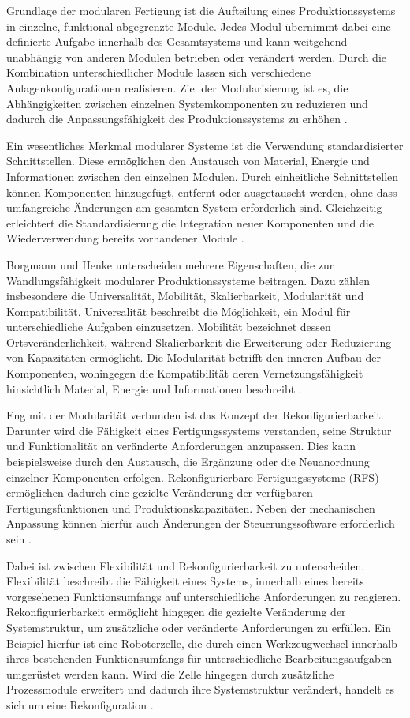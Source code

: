 Grundlage der modularen Fertigung ist die Aufteilung eines Produktionssystems in einzelne, funktional abgegrenzte Module. Jedes Modul übernimmt dabei eine definierte Aufgabe innerhalb des Gesamtsystems und kann weitgehend unabhängig von anderen Modulen betrieben oder verändert werden. Durch die Kombination unterschiedlicher Module lassen sich verschiedene Anlagenkonfigurationen realisieren. Ziel der Modularisierung ist es, die Abhängigkeiten zwischen einzelnen Systemkomponenten zu reduzieren und dadurch die Anpassungsfähigkeit des Produktionssystems zu erhöhen \cite{Borgmann2026}.

Ein wesentliches Merkmal modularer Systeme ist die Verwendung standardisierter Schnittstellen. Diese ermöglichen den Austausch von Material, Energie und Informationen zwischen den einzelnen Modulen. Durch einheitliche Schnittstellen können Komponenten hinzugefügt, entfernt oder ausgetauscht werden, ohne dass umfangreiche Änderungen am gesamten System erforderlich sind. Gleichzeitig erleichtert die Standardisierung die Integration neuer Komponenten und die Wiederverwendung bereits vorhandener Module \cite{Borgmann2026}.

Borgmann und Henke unterscheiden mehrere Eigenschaften, die zur Wandlungsfähigkeit modularer Produktionssysteme beitragen. Dazu zählen insbesondere die Universalität, Mobilität, Skalierbarkeit, Modularität und Kompatibilität. Universalität beschreibt die Möglichkeit, ein Modul für unterschiedliche Aufgaben einzusetzen. Mobilität bezeichnet dessen Ortsveränderlichkeit, während Skalierbarkeit die Erweiterung oder Reduzierung von Kapazitäten ermöglicht. Die Modularität betrifft den inneren Aufbau der Komponenten, wohingegen die Kompatibilität deren Vernetzungsfähigkeit hinsichtlich Material, Energie und Informationen beschreibt \cite{Borgmann2026}.

Eng mit der Modularität verbunden ist das Konzept der Rekonfigurierbarkeit. Darunter wird die Fähigkeit eines Fertigungssystems verstanden, seine Struktur und Funktionalität an veränderte Anforderungen anzupassen. Dies kann beispielsweise durch den Austausch, die Ergänzung oder die Neuanordnung einzelner Komponenten erfolgen. Rekonfigurierbare Fertigungssysteme (RFS) ermöglichen dadurch eine gezielte Veränderung der verfügbaren Fertigungsfunktionen und Produktionskapazitäten. Neben der mechanischen Anpassung können hierfür auch Änderungen der Steuerungssoftware erforderlich sein \cite{Trautner2026}.

Dabei ist zwischen Flexibilität und Rekonfigurierbarkeit zu unterscheiden. Flexibilität beschreibt die Fähigkeit eines Systems, innerhalb eines bereits vorgesehenen Funktionsumfangs auf unterschiedliche Anforderungen zu reagieren. Rekonfigurierbarkeit ermöglicht hingegen die gezielte Veränderung der Systemstruktur, um zusätzliche oder veränderte Anforderungen zu erfüllen. Ein Beispiel hierfür ist eine Roboterzelle, die durch einen Werkzeugwechsel innerhalb ihres bestehenden Funktionsumfangs für unterschiedliche Bearbeitungsaufgaben umgerüstet werden kann. Wird die Zelle hingegen durch zusätzliche Prozessmodule erweitert und dadurch ihre Systemstruktur verändert, handelt es sich um eine Rekonfiguration \cite{Trautner2026}.


